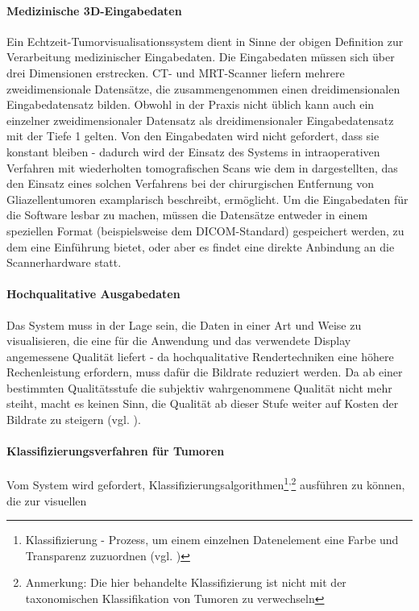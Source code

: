 \documentclass[pdftex,a4paper,titlepage,12pt]{scrartcl}
\newtheorem[L]{boxedDefinition}{Definition}
\begin{document}
\paragraph{Medizinische 3D-Eingabedaten} Ein Echtzeit-Tumorvisualisationssystem dient in Sinne der obigen Definition zur Verarbeitung medizinischer Eingabedaten. Die Eingabedaten müssen sich über drei Dimensionen erstrecken. CT- und MRT-Scanner liefern mehrere zweidimensionale Datensätze, die zusammengenommen einen dreidimensionalen Eingabedatensatz bilden. Obwohl in der Praxis nicht üblich kann auch ein einzelner zweidimensionaler Datensatz als dreidimensionaler Eingabedatensatz mit der Tiefe 1 gelten.  Von den Eingabedaten wird nicht gefordert, dass sie konstant bleiben - dadurch wird der Einsatz des Systems in intraoperativen Verfahren mit wiederholten tomografischen Scans wie dem in \cite{Okudera1994} dargestellten, das den Einsatz eines solchen Verfahrens bei der chirurgischen Entfernung von Gliazellentumoren examplarisch beschreibt, ermöglicht. Um die Eingabedaten für die Software lesbar zu machen, müssen die Datensätze entweder in einem speziellen Format (beispielsweise dem DICOM-Standard) gespeichert werden, zu dem \cite{Mildenberger2002} eine Einführung bietet, oder aber es findet eine direkte Anbindung an die Scannerhardware statt.

\paragraph{Hochqualitative Ausgabedaten} Das System muss in der Lage sein, die Daten in einer Art und Weise zu visualisieren, die eine für die Anwendung und das verwendete Display angemessene Qualität liefert - da hochqualitative Rendertechniken eine höhere Rechenleistung erfordern, muss dafür die Bildrate reduziert werden. Da ab einer bestimmten Qualitätsstufe die subjektiv wahrgenommene Qualität nicht mehr steiht, macht es keinen Sinn, die Qualität ab dieser Stufe weiter auf Kosten der Bildrate zu steigern (vgl. \cite[Kapitel 3.3, Seite 5]{Kutter2008}).

\paragraph{Klassifizierungsverfahren für Tumoren}Vom System wird gefordert, Klassifizierungsalgorithmen\footnote{Klassifizierung - Prozess, um einem einzelnen Datenelement eine Farbe und Transparenz zuzuordnen (vgl. \cite[Kapitel 3.2.2, Seite 28]{Bruckner2004})}\textsuperscript{,}\footnote{Anmerkung: Die hier behandelte Klassifizierung ist nicht mit der taxonomischen Klassifikation von Tumoren zu verwechseln} ausführen zu können, die zur visuellen 
\end{document}
